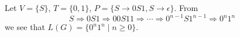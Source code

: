 

\setcounter{section}{5}
\setcounter{subsection}{1}
\setcounter{dfn}{3}

\begin{exl}
\label{exl:0n1n}
Let $V = \{S\}$, $T = \{0, 1\}$, $P = \{S \to 0S1, S \to \epsilon\}$.
From
\[
S \Rightarrow 0S1 \Rightarrow 00S11 \Rightarrow \cdots \Rightarrow 0^{n-1}S1^{n-1} \Rightarrow 0^n1^n
\]
we see that $L(G) = \{0^n1^n \mid n \ge 0\}$.
\end{exl}


